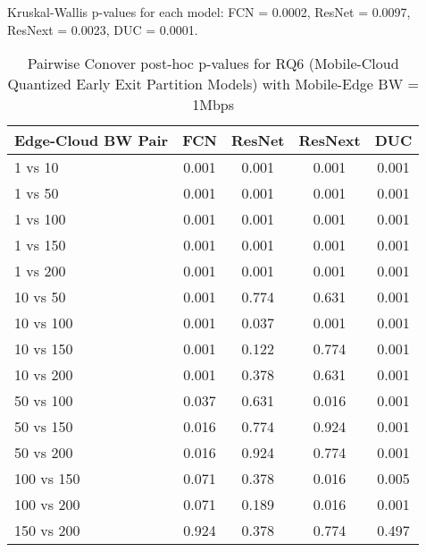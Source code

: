 \begin{table}[h]
\centering
\caption{Pairwise Conover post-hoc p-values for RQ6 (Mobile-Cloud Quantized Early Exit Partition Models) with Mobile-Edge BW = 1Mbps}
\label{tab:conover_mobile_cloud_quantized_earlyexit_partition_me1}
\smallskip
Kruskal-Wallis p-values for each model: FCN = 0.0002, ResNet = 0.0097, ResNext = 0.0023, DUC = 0.0001.

\begin{tabular}{lcccc}
\toprule
Edge-Cloud BW Pair & FCN & ResNet & ResNext & DUC \\
\midrule
1 vs 10 & 0.001 & 0.001 & 0.001 & 0.001 \\
1 vs 50 & 0.001 & 0.001 & 0.001 & 0.001 \\
1 vs 100 & 0.001 & 0.001 & 0.001 & 0.001 \\
1 vs 150 & 0.001 & 0.001 & 0.001 & 0.001 \\
1 vs 200 & 0.001 & 0.001 & 0.001 & 0.001 \\
10 vs 50 & 0.001 & 0.774 & 0.631 & 0.001 \\
10 vs 100 & 0.001 & 0.037 & 0.001 & 0.001 \\
10 vs 150 & 0.001 & 0.122 & 0.774 & 0.001 \\
10 vs 200 & 0.001 & 0.378 & 0.631 & 0.001 \\
50 vs 100 & 0.037 & 0.631 & 0.016 & 0.001 \\
50 vs 150 & 0.016 & 0.774 & 0.924 & 0.001 \\
50 vs 200 & 0.016 & 0.924 & 0.774 & 0.001 \\
100 vs 150 & 0.071 & 0.378 & 0.016 & 0.005 \\
100 vs 200 & 0.071 & 0.189 & 0.016 & 0.001 \\
150 vs 200 & 0.924 & 0.378 & 0.774 & 0.497 \\
\bottomrule
\end{tabular}
\end{table}

